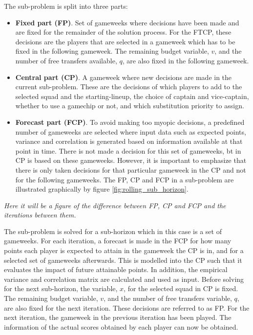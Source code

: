 The sub-problem is split into three parts:
\begin{itemize}
    \item \textbf{Fixed part (FP)}. Set of gameweeks where decisions have been made and are fixed for the remainder of the solution process. For the FTCP, these decisions are the players that are selected in a gameweek which has to be fixed in the following gameweek. The remaining budget variable, $v$, and the number of free transfers available, $q$, are also fixed in the following gameweek.
    \item \textbf{Central part (CP)}. A gameweek where new decisions are made in the current sub-problem. These are the decisions of which players to add to the selected squad and the starting-lineup, the choice of captain and vice-captain, whether to use a gamechip or not, and which substitution priority to assign. 
    \item \textbf{Forecast part (FCP)}. To avoid making too myopic decisions, a predefined number of gameweeks are selected where input data such as expected points, variance and correlation is generated based on information available at that point in time. There is not made a decision for this set of gameweeks, bt in CP is based on these gameweeks. However, it is important to emphasize that there is only taken decisions for that particular gameweek in the CP and not for the following gameweeks. The FP, CP and FCP in a sub-problem are illustrated graphically by figure \ref{fig:rolling_sub_horizon}.
\end{itemize}

\newpar

\textit{Here it will be a figure of the difference between FP, CP and FCP and the iterations between them.}

\newpar

The sub-problem is solved for a sub-horizon which in this case is a set of gameweeks. For each iteration, a forecast is made in the FCP for how many points each player is expected to attain in the gameweek the CP is in, and for a selected set of gameweeks afterwards. This is modelled into the CP such that it evaluates the impact of future attainable points. In addition, the empirical variance and correlation matrix are calculated and used as input. Before solving for the next sub-horizon, the variable, $x$, for the selected squad in CP is fixed. The remaining budget variable, $v$, and the number of free transfers variable, $q$, are also fixed for the next iteration. These decisions are referred to as FP. For the next iteration, the gameweek in the previous iteration has been played. The information of the actual scores obtained by each player can now be obtained. 


